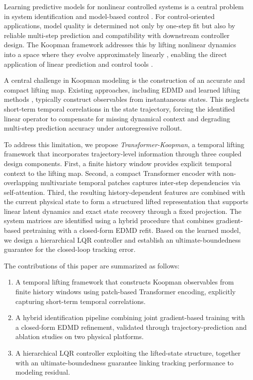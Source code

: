 \documentclass[journal]{IEEEtran}
\begin{document}
Learning predictive models for nonlinear controlled systems is a central problem in system identification and model-based control \cite{ljung1999system, vanoverschee1994n4sid, nelles2020nonlinear}. For control-oriented applications, model quality is determined not only by one-step fit but also by reliable multi-step prediction and compatibility with downstream controller design. The Koopman framework addresses this by lifting nonlinear dynamics into a space where they evolve approximately linearly \cite{koopman1931hamiltonian, brunton2022modern}, enabling the direct application of linear prediction and control tools \cite{otto2021koopman, korda2018linear}.

A central challenge in Koopman modeling is the construction of an accurate and compact lifting map. Existing approaches, including EDMD \cite{williams2015data} and learned lifting methods \cite{lusch2018deep, takeishi2017koopman}, typically construct observables from instantaneous states. This neglects short-term temporal correlations in the state trajectory, forcing the identified linear operator to compensate for missing dynamical context and degrading multi-step prediction accuracy under autoregressive rollout.

To address this limitation, we propose \emph{Transformer-Koopman}, a temporal lifting framework that incorporates trajectory-level information through three coupled design components. First, a finite history window provides explicit temporal context to the lifting map. Second, a compact Transformer encoder with non-overlapping multivariate temporal patches captures inter-step dependencies via self-attention. Third, the resulting history-dependent features are combined with the current physical state to form a structured lifted representation that supports linear latent dynamics and exact state recovery through a fixed projection. The system matrices are identified using a hybrid procedure that combines gradient-based pretraining with a closed-form EDMD refit. Based on the learned model, we design a hierarchical LQR controller and establish an ultimate-boundedness guarantee for the closed-loop tracking error.

The contributions of this paper are summarized as follows:
\begin{enumerate}
    \item A temporal lifting framework that constructs Koopman observables from finite history windows using patch-based Transformer encoding, explicitly capturing short-term temporal correlations.
    \item A hybrid identification pipeline combining joint gradient-based training with a closed-form EDMD refinement, validated through trajectory-prediction and ablation studies on two physical platforms.
    \item A hierarchical LQR controller exploiting the lifted-state structure, together with an ultimate-boundedness guarantee linking tracking performance to modeling residual.
\end{enumerate}
\end{document}
